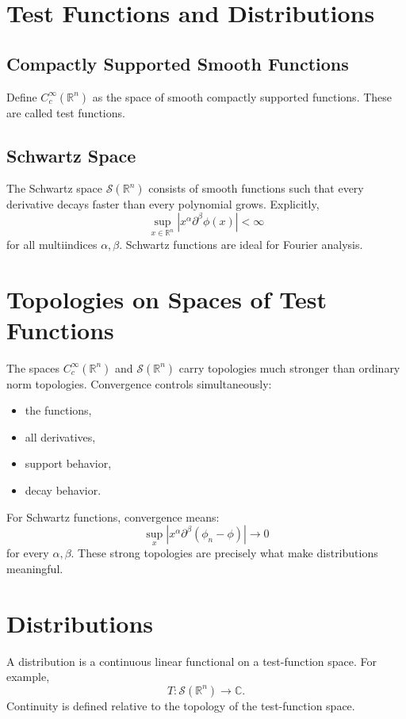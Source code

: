 \documentclass[aps,prl,twocolumn,groupedaddress]{revtex4-2}
\begin{document}
\section{Test Functions and Distributions}

\subsection{Compactly Supported Smooth Functions}
Define $C_c^\infty(\mathbb{R}^n)$ as the space of smooth compactly supported functions. These are called test functions.

\subsection{Schwartz Space}
The Schwartz space $\mathcal{S}(\mathbb{R}^n)$ consists of smooth functions such that every derivative decays faster than every polynomial grows. Explicitly,
\[
\sup_{x \in \mathbb{R}^n} |x^\alpha \partial^\beta \phi(x)| < \infty 
\]
for all multiindices $\alpha, \beta$. Schwartz functions are ideal for Fourier analysis.

\section{Topologies on Spaces of Test Functions}

The spaces $C_c^\infty(\mathbb{R}^n)$ and $\mathcal{S}(\mathbb{R}^n)$ carry topologies much stronger than ordinary norm topologies. Convergence controls simultaneously:
\begin{itemize}
\item the functions,
\item all derivatives,
\item support behavior,
\item decay behavior.
\end{itemize}

For Schwartz functions, convergence means:
\[
\sup_x |x^\alpha \partial^\beta (\phi_n - \phi)| \rightarrow 0 
\]
for every $\alpha, \beta$. These strong topologies are precisely what make distributions meaningful.

\section{Distributions}

A distribution is a continuous linear functional on a test-function space. For example,
\[
T : \mathcal{S}(\mathbb{R}^n) \rightarrow \mathbb{C}.
\]
Continuity is defined relative to the topology of the test-function space.
\end{document}
